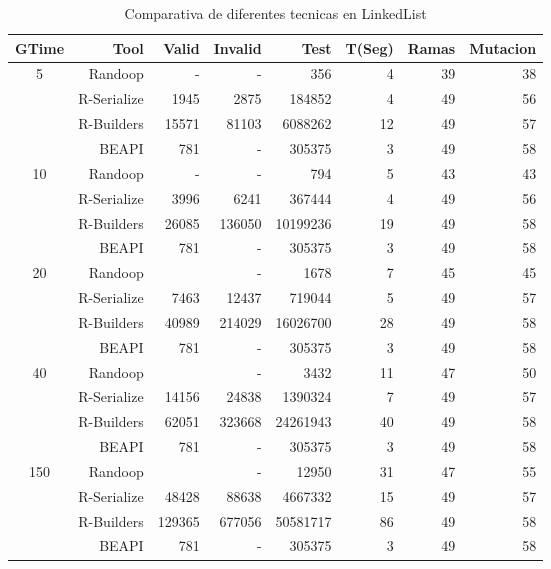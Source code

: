 \begin{table}[H]
\scriptsize
\centering
\begin{tabular}{ c  r  |r | r | r|r|r|r  }
  \toprule
  \textbf{GTime} & \textbf{Tool} & \textbf{Valid}  & \textbf{Invalid} & \textbf{Test}&\textbf{T(Seg)} &\textbf{Ramas}  & \textbf{Mutacion} \\ 
  \midrule
5	&	Randoop	&	-	&	-	&	356	&	4	&	39	&	38	\\
	&	R-Serialize	&	1945	&	2875	&	184852	&	4	&	49	&	56	\\
	&	R-Builders	&	15571	&	81103	&	6088262	&	12	&	49	&	57	\\
	&	BEAPI	&	781	&	-	&	305375	&	3	&	49	&	58	\\
 \cline{2-8}															
10	&	Randoop	&	-	&	-	&	794	&	5	&	43	&	43	\\
	&	R-Serialize	&	3996	&	6241	&	367444	&	4	&	49	&	56	\\
	&	R-Builders	&	26085	&	136050	&	10199236	&	19	&	49	&	58	\\
	&	BEAPI	&	781	&	-	&	305375	&	3	&	49	&	58	\\
 \cline{2-8}															
20	&	Randoop	&		&	-	&	1678	&	7	&	45	&	45	\\
	&	R-Serialize	&	7463	&	12437	&	719044	&	5	&	49	&	57	\\
	&	R-Builders	&	40989	&	214029	&	16026700	&	28	&	49	&	58	\\
	&	BEAPI	&	781	&	-	&	305375	&	3	&	49	&	58	\\
 \cline{2-8}															
40	&	Randoop	&		&	-	&	3432	&	11	&	47	&	50	\\
	&	R-Serialize	&	14156	&	24838	&	1390324	&	7	&	49	&	57	\\
	&	R-Builders	&	62051	&	323668	&	24261943	&	40	&	49	&	58	\\
	&	BEAPI	&	781	&	-	&	305375	&	3	&	49	&	58	\\
 \cline{2-8}															
150	&	Randoop	&		&	-	&	12950	&	31	&	47	&	55	\\
	&	R-Serialize	&	48428	&	88638	&	4667332	&	15	&	49	&	57	\\
	&	R-Builders	&	129365	&	677056	&	50581717	&	86	&	49	&	58	\\
	&	BEAPI	&	781	&	-	&	305375	&	3	&	49	&	58	\\
\midrule
\end{tabular}
\caption{Comparativa de diferentes tecnicas en LinkedList}
\label{tab:linkedListTools}
\end{table}

